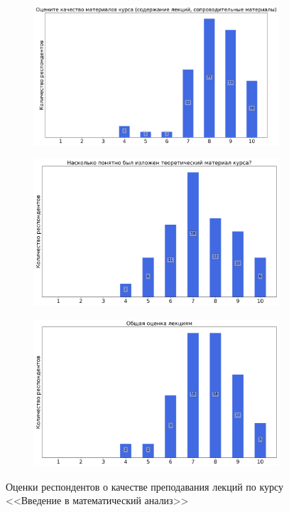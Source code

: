 \begin{figure}[H]
\begin{subfigure}[b]{0.45\textwidth}
			\end{subfigure}
			\begin{subfigure}[b]{0.45\textwidth}
				\centering
				\includegraphics[width=\textwidth]{images/1 course/Математический анализ/lecturer-marks-Знаменская Л.Н.-1.png}
			\end{subfigure}
			\begin{subfigure}[b]{0.45\textwidth}
				\centering
				\includegraphics[width=\textwidth]{images/1 course/Математический анализ/lecturer-marks-Знаменская Л.Н.-2.png}
			\end{subfigure}	
			\begin{subfigure}[b]{0.45\textwidth}
				\centering
				\includegraphics[width=\textwidth]{images/1 course/Математический анализ/lecturer-marks-Знаменская Л.Н.-3.png}
			\end{subfigure}
			\caption{Оценки респондентов о качестве преподавания лекций по курсу <<Введение в математический анализ>>}
		\end{figure}

